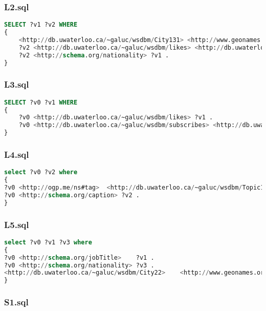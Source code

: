 \documentclass[titlepage, a4paper, 12pt] {article}
\begin{document}
\subsubsection{L2.sql}

\begin{lstlisting}[language=SQL] 
SELECT ?v1 ?v2 WHERE 
{
	<http://db.uwaterloo.ca/~galuc/wsdbm/City131> <http://www.geonames.org/ontology#parentCountry> ?v1 .
	?v2 <http://db.uwaterloo.ca/~galuc/wsdbm/likes> <http://db.uwaterloo.ca/~galuc/wsdbm/Product0> .
	?v2 <http://schema.org/nationality> ?v1 .
}
\end{lstlisting}

\subsubsection{L3.sql}

\begin{lstlisting}[language=SQL]
SELECT ?v0 ?v1 WHERE 
{
	?v0 <http://db.uwaterloo.ca/~galuc/wsdbm/likes> ?v1 .
	?v0 <http://db.uwaterloo.ca/~galuc/wsdbm/subscribes> <http://db.uwaterloo.ca/~galuc/wsdbm/Website20769> .
}
\end{lstlisting}

\subsubsection{L4.sql}

\begin{lstlisting}[language=SQL]
select ?v0 ?v2 where 
{
?v0	<http://ogp.me/ns#tag>	<http://db.uwaterloo.ca/~galuc/wsdbm/Topic117> . 
?v0	<http://schema.org/caption>	?v2 . 
}
\end{lstlisting}

\subsubsection{L5.sql}

\begin{lstlisting}[language=SQL]
select ?v0 ?v1 ?v3 where 
{
?v0	<http://schema.org/jobTitle>	?v1 . 
?v0	<http://schema.org/nationality>	?v3 . 
<http://db.uwaterloo.ca/~galuc/wsdbm/City22>	<http://www.geonames.org/ontology#parentCountry>	?v3 . 
}
\end{lstlisting}

\subsubsection{S1.sql}
\end{document}
